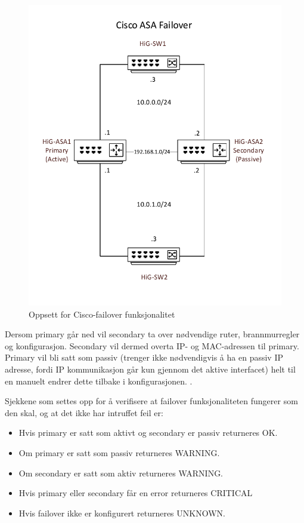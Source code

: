 \begin{figure}[H]
    \centering
    \includegraphics[scale=0.6]{img/asafailover}
    \caption{Oppsett for Cisco-failover funksjonalitet}
    \label{ciscoasafailover}
\end{figure}


Dersom primary går ned vil secondary ta over nødvendige ruter, brannmurregler og konfigurasjon. Secondary vil dermed overta IP- og MAC-adressen til primary. Primary vil bli satt som passiv (trenger ikke nødvendigvis å ha en passiv IP adresse, fordi IP kommunikasjon går kun gjennom det aktive interfacet) helt til en manuelt endrer dette tilbake i konfigurasjonen. \cite{ciscofailover}. 

Sjekkene som settes opp for å verifisere at failover funksjonaliteten fungerer som den skal, og at det ikke har intruffet feil er:
\begin{itemize}
\item Hvis primary er satt som aktivt og secondary er passiv returneres OK.
\item Om primary er satt som passiv returneres WARNING. 
\item Om secondary er satt som aktiv returneres WARNING.
\item Hvis primary eller secondary får en error returneres CRITICAL
\item Hvis failover ikke er konfigurert returneres UNKNOWN. 
\end{itemize}

